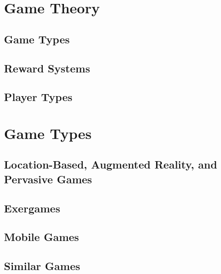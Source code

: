 
\chapter{Game Theory}
\label{chapter:lit-study-game-theory}

\section{Game Types}


\section{Reward Systems}
\label{sec:reward-systems}


\section{Player Types}


\chapter{Game Types}
\label{chapter:lit-study-game-types}

\section{Location-Based, Augmented Reality, and Pervasive Games}
\label{sec:prestudy-ar-location-pervasive-games}

\section{Exergames}

\section{Mobile Games}
\label{sec:mobile-games}


\section{Similar Games}

